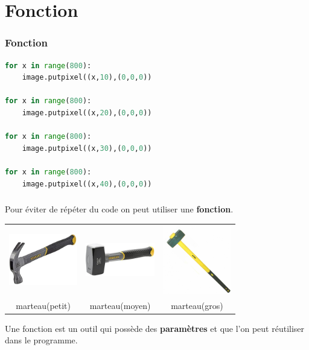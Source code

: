 \documentclass[svgnames,11pt]{beamer}
\begin{document}
\section{Fonction}
\begin{frame}[fragile]
    \frametitle{Fonction}

\begin{center}
\begin{lstlisting}[language=Python , basicstyle=\ttfamily\small, xleftmargin=2em, xrightmargin=2em]
for x in range(800):
    image.putpixel((x,10),(0,0,0))

for x in range(800):
    image.putpixel((x,20),(0,0,0))

for x in range(800):
    image.putpixel((x,30),(0,0,0))

for x in range(800):
    image.putpixel((x,40),(0,0,0))
\end{lstlisting}
\label{CODE}
\end{center}

\end{frame}
\begin{frame}
    \frametitle{}
Pour éviter de répéter du code on peut utiliser une \textbf{fonction}.
\begin{center}
    \begin{tabular}{ccc}
\includegraphics[width=3cm]{ressources/marteau1.jpg}
&
\includegraphics[width=3cm]{ressources/marteau2.jpg}
&
\includegraphics[width=3cm]{ressources/marteau3.jpg}
\\
marteau(petit)&marteau(moyen)&marteau(gros)\\
    \end{tabular}
\end{center}
\begin{aretenir}[]
Une fonction est un outil qui possède des \textbf{paramètres} et que l'on peut réutiliser dans le programme.
\end{aretenir}
\end{frame}
\end{document}
